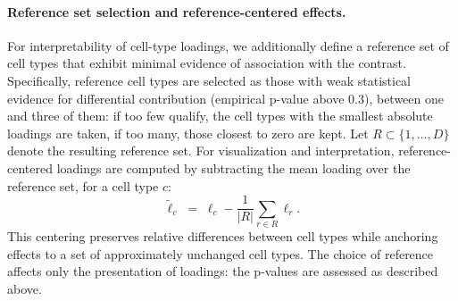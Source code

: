 \documentclass{article}
\begin{document}
\paragraph{Reference set selection and reference-centered effects.}
For interpretability of cell-type loadings, we additionally define a
reference set of cell types that exhibit minimal evidence of association
with the contrast. Specifically, reference cell types are selected as
those with weak statistical evidence for differential contribution
(empirical p-value above 0.3), between one and three of them: if too few
qualify, the cell types with the smallest absolute loadings are taken,
if too many, those closest to zero are kept. Let $R \subset
\{1,\dots,D\}$ denote the resulting reference set. For visualization and
interpretation, reference-centered loadings are computed by subtracting
the mean loading over the reference set, for a cell type $c$:
\[
\tilde{\ell}_c \;=\; \ell_c - \frac{1}{|R|}\sum_{r \in R} \ell_r .
\]
This centering preserves relative differences between cell types while
anchoring effects to a set of approximately unchanged cell types. The
choice of reference affects only the presentation of loadings: the p-values are assessed as described above.
\end{document}
